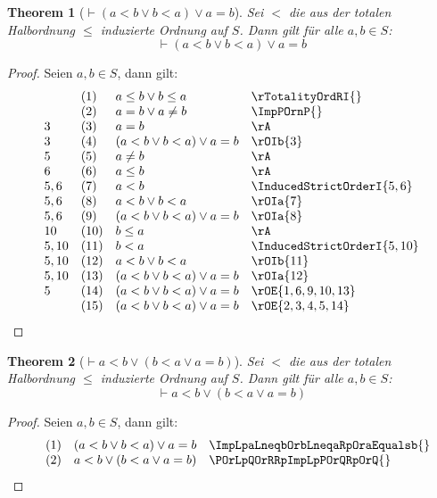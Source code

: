 \documentclass{book}
\theoremstyle{plain}
\newtheorem{theorem}{Theorem}
\theoremstyle{remark}
\theoremstyle{definition}
\begin{document}
\label{ImpLpaLneqbOrbLneqaRpOraEqualsb}
\begin{theorem}[\(\vdash (a<b\lor b<a)\lor a=b\)]
    Sei \(<\) die aus der totalen Halbordnung \(\leq\) induzierte Ordnung auf \(S\). Dann gilt für alle \(a,b\in S\):
    \[
    \vdash (a<b\lor b<a)\lor a=b
    \]
\end{theorem}
\begin{proof}
        Seien \(a,b\in S\), dann gilt:
	\[
        \begin{array}{llll}
            & (1) & a\leq b\lor b\leq a & \rTotalityOrdRI{} \\
            & (2) & a=b\lor a\neq b & \ImpPOrnP{} \\
          3 & (3) & a=b & \rA \\
          3 & (4) & (a<b\lor b<a)\lor a=b & \rOIb{3} \\
          5 & (5) & a\neq b & \rA \\
          6 & (6) & a\leq b & \rA \\
          5,6 & (7) & a<b & \InducedStrictOrderI{5,6} \\
          5,6 & (8) & a<b\lor b<a  & \rOIa{7} \\
          5,6 & (9) & (a<b\lor b<a)\lor a=b  & \rOIa{8} \\
          10 & (10) & b\leq a  & \rA \\
          5,10 & (11) & b<a  & \InducedStrictOrderI{5,10} \\
          5,10 & (12) & a<b\lor b<a  & \rOIb{11} \\
          5,10 & (13) & (a<b\lor b<a)\lor a=b  & \rOIa{12} \\
          5    & (14) & (a<b\lor b<a)\lor a=b  & \rOE{1,6,9,10,13} \\
               & (15) & (a<b\lor b<a)\lor a=b  & \rOE{2,3,4,5,14} \\
        \end{array}
	\]
\end{proof}

\label{aLneqbOrLpbLneqaOraEqualsbRp}
\begin{theorem}[\(\vdash a<b\lor (b<a\lor a=b)\)]
    Sei \(<\) die aus der totalen Halbordnung \(\leq\) induzierte Ordnung auf \(S\). Dann gilt für alle \(a,b\in S\):
    \[
    \vdash a<b\lor (b<a\lor a=b)
    \]
\end{theorem}
\begin{proof}
        Seien \(a,b\in S\), dann gilt:
	\[
        \begin{array}{llll}
            & (1) & (a<b\lor b<a)\lor a=b & \ImpLpaLneqbOrbLneqaRpOraEqualsb{} \\
            & (2) & a<b\lor (b<a\lor a=b) & \POrLpQOrRRpImpLpPOrQRpOrQ{} \\
        \end{array}
	\]
\end{proof}
\end{document}
